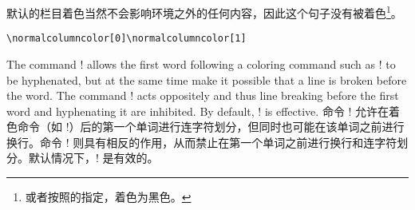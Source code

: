 \begin{description}
\begin{itemize}
默认的栏目着色当然不会影响环境之外的任何内容，因此这个句子没有被着色\footnote{或者按照的指定，着色为黑色。}。

\begin{Verbatim}
\normalcolumncolor[0]\normalcolumncolor[1]
\end{Verbatim}
\normalcolumncolor[0]\normalcolumncolor[1]

\end{itemize}



\item[\Midx{\!\coloredwordhyphenated!}]\mbox{}
\Item[\Midx{\!\nocoloredwordhyphenated!}]\mbox{}\par
{}
\begin{paracol}{2}
The command \!! allows the first word following a
coloring command such as \!\color! to be hyphenated, but at the same time
make it possible that a line is broken before the word.  The command
\!\nocoloredwordhyphenated! acts oppositely and thus line breaking before
the first word and hyphenating it are inhibited.  By default,
\!! is effective.
\switchcolumn
命令 \!! 允许在着色命令（如 \!\color!）后的第一个单词进行连字符划分，但同时也可能在该单词之前进行换行。命令 \!\nocoloredwordhyphenated! 则具有相反的作用，从而禁止在第一个单词之前进行换行和连字符划分。默认情况下，\!! 是有效的。


\end{paracol}
\end{description}
